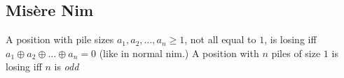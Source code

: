 \documentclass[12pt]{extarticle}
\begin{document}
\begin{multicols*}{2}

\subsection{Mis\`{e}re Nim}
A position with pile sizes $a_1, a_2, \dots, a_n \ge 1$,
not all equal to $1$, is losing iff $a_1 \oplus a_2 \oplus \dots \oplus a_n = 0$
(like in normal nim.)
A position with $n$ piles of size $1$ is losing iff $n$ is \emph{odd}









\end{multicols*}
\end{document}
